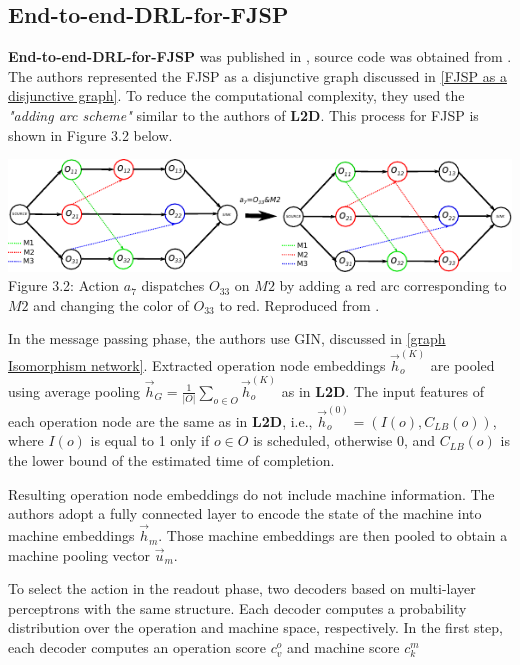 \subsection{End-to-end-DRL-for-FJSP} 

\textbf{End-to-end-DRL-for-FJSP} was published in \cite{LEI2022117796}, source code was obtained from \cite{github_end_to_end_drl_for_fjsp}. The authors represented the FJSP as a disjunctive graph discussed in \ref{FJSP as a disjunctive graph}. To reduce the computational complexity, they used the \textit{"adding arc scheme"} similar to the authors of \textbf{L2D}. This process for FJSP is shown in Figure 3.2 below.
\begin{center}
    \includegraphics[width=\linewidth]{images/fjsp_adding_arcs.pdf}\\
    Figure 3.2: Action $a_7$ dispatches $O_{33}$ on $M2$ by adding a red arc corresponding to $M2$ and changing the color of $O_{33}$ to red. Reproduced from \cite{LEI2022117796}.
\end{center}
In the message passing phase, the authors use GIN, discussed in \ref{graph Isomorphism network}. Extracted operation node embeddings $\vec{h}_o^{(K)}$ are pooled using average pooling $\vec{h}_G = \frac{1}{|O|} \sum_{o \in O} \vec{h}_o^{(K)}$ as in \textbf{L2D}. The input features of each operation node are the same as in \textbf{L2D}, i.e., $\vec{h}_o^{(0)} = (I(o), C_{LB}(o))$, where $I(o)$ is equal to 1 only if $o \in O$ is scheduled, otherwise 0, and $C_{LB}(o)$ is the lower bound of the estimated time of completion.
\par
Resulting operation node embeddings do not include machine information. The authors adopt a fully connected layer to encode the state of the machine into machine embeddings $\vec{h}_m$. Those machine embeddings are then pooled to obtain a machine pooling vector $\vec{u}_m$. 
\par
To select the action in the readout phase, two decoders based on multi-layer perceptrons with the same structure. Each decoder computes a probability distribution over the operation and machine space, respectively. In the first step, each decoder computes an operation score $c^o_{v}$ and machine score $c^m_{k}$ \cite{LEI2022117796}
